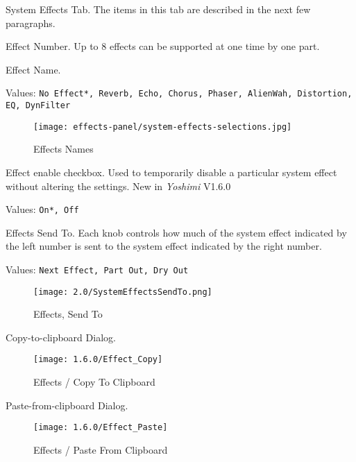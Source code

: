   \setcounter{ItemCounter}{0}      %

   System Effects Tab.
   The items in this tab are described in the next few paragraphs.

   Effect Number.
   Up to 8 effects can be supported at one time by one part.

   Effect Name.

   Values: \texttt{No Effect*, Reverb, Echo, Chorus, Phaser, AlienWah,
      Distortion, EQ, DynFilter}

\begin{figure}[H]
   \centering
   \texttt{[image: effects-panel/system-effects-selections.jpg]}
   \caption{Effects Names}
   \label{fig:effects_names}
\end{figure}

   Effect enable checkbox. Used to temporarily disable a particular system
   effect without altering the settings. New in \textsl{Yoshimi} V1.6.0

   Values: \texttt{On*, Off}

   Effects Send To.
   Each knob controls how much of the system effect indicated by the left
   number is sent to the system effect indicated by the right number.

   Values: \texttt{Next Effect, Part Out, Dry Out}

\begin{figure}[H]
   \centering
   \texttt{[image: 2.0/SystemEffectsSendTo.png]}
   \caption{Effects, Send To}
   \label{fig:effects_send_to}
\end{figure}

   Copy-to-clipboard Dialog.

\begin{figure}[H]
   \centering
   \texttt{[image: 1.6.0/Effect\_Copy]}
   \caption{Effects / Copy To Clipboard}
   \label{fig:effects_copy_to_clipboard}
\end{figure}

   Paste-from-clipboard Dialog.

\begin{figure}[H]
   \centering
   \texttt{[image: 1.6.0/Effect\_Paste]}
   \caption{Effects / Paste From Clipboard}
   \label{fig:effects_paste_from_clipboard}
\end{figure}


